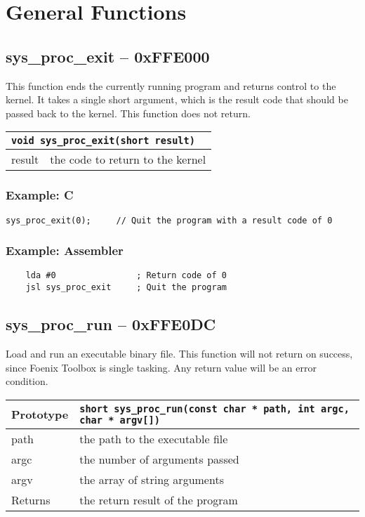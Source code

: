 \section{General Functions}

\subsection*{sys\_proc\_exit -- 0xFFE000}
This function ends the currently running program and returns control to the kernel. It takes a single short argument,
which is the result code that should be passed back to the kernel. This function does not return.

\bigskip

\begin{tabular}{|l|l|} \hline
\multicolumn{2}{|l|}{\lstinline!void sys_proc_exit(short result)!} \\ \hline\hline
result    & the code to return to the kernel \\ \hline
\end{tabular}

\subsubsection*{Example: C}
\begin{lstlisting}
sys_proc_exit(0);     // Quit the program with a result code of 0
\end{lstlisting}

\subsubsection*{Example: Assembler}
\begin{verbatim}
    lda #0                ; Return code of 0
    jsl sys_proc_exit     ; Quit the program
\end{verbatim}

\subsection*{sys\_proc\_run -- 0xFFE0DC}
Load and run an executable binary file.
This function will not return on success, since Foenix Toolbox is single tasking.
Any return value will be an error condition.

\bigskip

\begin{tabular}{|l||l|} \hline
Prototype & \lstinline!short sys_proc_run(const char * path, int argc, char * argv[])! \\ \hline
path & the path to the executable file \\ \hline
argc & the number of arguments passed \\ \hline
argv & the array of string arguments \\ \hline
Returns & the return result of the program \\ \hline
\end{tabular}


